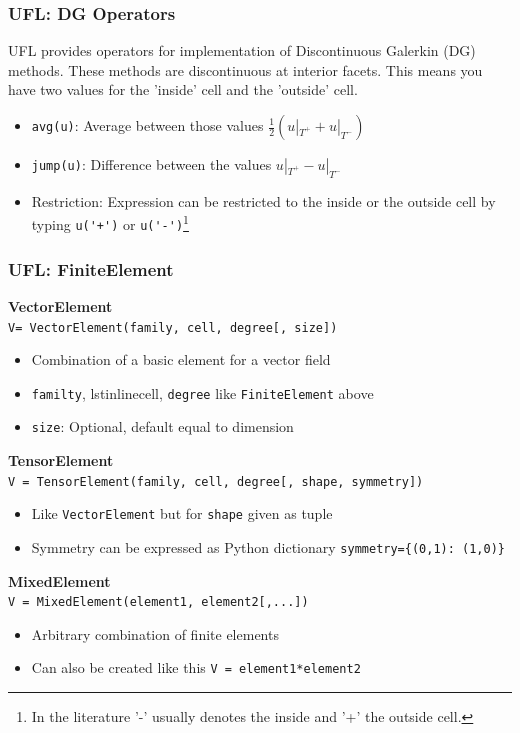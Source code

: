 \documentclass[ignorenonframetext,11pt]{beamer}
\theoremstyle{definition}
\begin{document}
\begin{frame}[fragile]
  \frametitle{UFL: DG Operators} UFL provides operators for implementation of
  Discontinuous Galerkin (DG) methods. These methods are discontinuous at
  interior facets. This means you have two values for the 'inside' cell and the
  'outside' cell.
  \begin{itemize}
  \item \lstinline{avg(u)}: Average between those values
    $\frac{1}{2}(u|_{T^+}+u|_{T^-})$
  \item \lstinline{jump(u)}: Difference between the values $u|_{T^+}-u|_{T^-}$
  \item Restriction: Expression can be restricted to the inside or the outside
    cell by typing \lstinline{u('+')} or \lstinline{u('-')}\footnote{In the
      literature '-' usually denotes the inside and '+' the outside cell.}
  \end{itemize}
\end{frame}

\begin{frame}[fragile]
  \frametitle{UFL: FiniteElement}
  \textbf{VectorElement}\\
  \lstinline[basicstyle=\small]{V= VectorElement(family, cell, degree[, size])}
  \begin{itemize}
  \item Combination of a basic element for a vector field
  \item \lstinline{familty}, lstinline{cell}, \lstinline{degree} like \lstinline{FiniteElement} above
  \item \lstinline{size}: Optional, default equal to dimension
  \end{itemize}

  \textbf{TensorElement}\\
  \lstinline[basicstyle=\small]{V = TensorElement(family, cell, degree[, shape, symmetry])}
  \begin{itemize}
  \item Like \lstinline{VectorElement} but for \lstinline{shape} given as tuple
  \item Symmetry can be expressed as Python dictionary
    \lstinline|symmetry={(0,1): (1,0)}|
  \end{itemize}


  \textbf{MixedElement}\\
  \lstinline[basicstyle=\small]{V = MixedElement(element1, element2[,...])}
  \begin{itemize}
  \item Arbitrary combination of finite elements
  \item Can also be created like this \lstinline{V = element1*element2}
  \end{itemize}
\end{frame}
\end{document}
